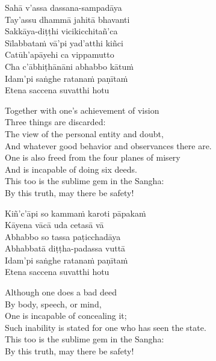 \begin{pali-hang-continued}
  Sahā v'assa dassana-sampadāya\\
  Tay'assu dhammā jahitā bhavanti\\
  Sakkāya-diṭṭhi vicikicchitañ'ca\\
  Sīlabbataṁ vā'pi yad'atthi kiñci\\
  Catūh'apāyehi ca vippamutto\\
  Cha c'ābhiṭhānāni abhabbo kātuṁ\\
  Idam'pi saṅghe ratanaṁ paṇītaṁ\\
  Etena saccena suvatthi hotu
\end{pali-hang-continued}

\begin{english-verses}
  Together with one's achievement of vision\\
  Three things are discarded:\\
  The view of the personal entity and doubt,\\
  And whatever good behavior and observances there are.\\
  One is also freed from the four planes of misery\\
  And is incapable of doing six deeds.\\
  This too is the sublime gem in the Sangha:\\
  By this truth, may there be safety!
\end{english-verses}

\begin{pali-hang-continued}
  Kiñ'c'āpi so kammaṁ karoti pāpakaṁ\\
  Kāyena vācā uda cetasā vā\\
  Abhabbo so tassa paṭicchadāya\\
  Abhabbatā diṭṭha-padassa vuttā\\
  Idam'pi saṅghe ratanaṁ paṇītaṁ\\
  Etena saccena suvatthi hotu
\end{pali-hang-continued}

\begin{english-verses}
  Although one does a bad deed\\
  By body, speech, or mind,\\
  One is incapable of concealing it;\\
  Such inability is stated for one who has seen the state.\\
  This too is the sublime gem in the Sangha:\\
  By this truth, may there be safety!
\end{english-verses}

